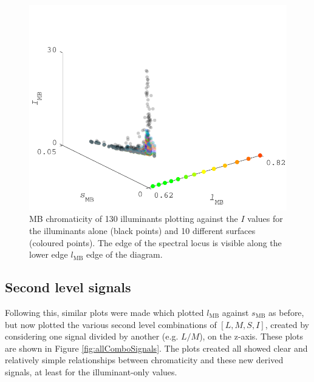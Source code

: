 \begin{figure}[htbp]
    \includegraphics[max width=\textwidth]{figs/comp/predictingChromaticity/CvsI.pdf}
    \caption{\gls{MB} chromaticity of 130 illuminants plotting against the $I$ values for the illuminants alone (black points) and 10 different surfaces (coloured points). The edge of the spectral locus is visible along the lower edge $l_{\text{MB}}$ edge of the diagram.}
    \label{fig:level1}
\end{figure} 

\subsection{Second level signals}
Following this, similar plots were made which plotted $l_{\text{MB}}$ against $s_{\text{MB}}$ as before, but now plotted the various second level combinations of $[L,M,S,I]$, created by considering one signal divided by another (e.g. $L/M$), on the z-axis. These plots are shown in Figure \ref{fig:allComboSignals}. The plots created all showed clear and relatively simple relationships between chromaticity and these new derived signals, at least for the illuminant-only values. 

\begin{fullpagefigure}
\caption{Relationship between chromaticity and second level signals. Plotted on the x-axis here is $l_{\text{MB}}$, with second level signals on the apparent y-axis. During analysis these plots were three dimensional, with the apparent y-axis being a z-axis and the x-axis joined by a y-axis of $s_{\text{MB}}$. As before, red points indicate signals computed directly from the spectral power distribution, grey points represent values of computed colorimetry for objects under illuminants. It can be seen that on a per object basis (incl. no object) there is good correlation between all of the above signals (though often it is non-linear).}
\label{fig:allComboSignals}
\end{fullpagefigure}

